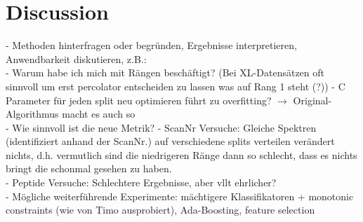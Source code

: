 \documentclass[10pt,a4paper]{article}
\begin{document}
	\section{Discussion}
		- Methoden hinterfragen oder begründen, Ergebnisse interpretieren, Anwendbarkeit diskutieren, z.B.:\\
		- Warum habe ich mich mit Rängen beschäftigt? (Bei XL-Datensätzen oft sinnvoll um erst percolator entscheiden zu lassen was auf Rang 1 steht (?))
		- C Parameter für jeden split neu optimieren führt zu overfitting? $\rightarrow$ Original-Algorithmus macht es auch so\\
		- Wie sinnvoll ist die neue Metrik?
		- ScanNr Versuche: Gleiche Spektren (identifiziert anhand der ScanNr.) auf verschiedene splits verteilen verändert nichts, d.h. vermutlich sind die niedrigeren Ränge dann so schlecht, dass es nichts bringt die schonmal gesehen zu haben.\\
		- Peptide Versuche: Schlechtere Ergebnisse, aber vllt ehrlicher?\\
		- Mögliche weiterführende Experimente: mächtigere Klassifikatoren + monotonic constraints (wie von Timo ausprobiert), Ada-Boosting, feature selection
\end{document}
